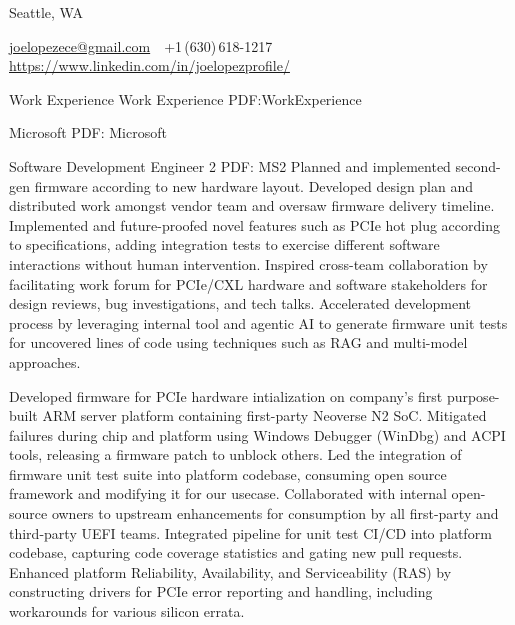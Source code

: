 \documentclass[letterpaper,MMMyyyy,nonstopmode]{simpleresumecv}
\newcommand {\CVAuthor}{Joe Lopez}
\newcommand {\CVLinkedin}{https://www.linkedin.com/in/joelopezprofile/}
\begin{document}

\Title{\CVAuthor}

\begin{SubTitle}
    Seattle, WA
    \par
    \href{mailto:joelopezece@gmail.com}{joelopezece@gmail.com}
    \,\SubBulletSymbol\,
    +1\,(630)\,618-1217
    \,\SubBulletSymbol\,
    \href{\CVLinkedin}
    {\url{\CVLinkedin}}
\end{SubTitle}

\begin{Body}

\Section
{Work Experience}
{Work Experience}
{PDF:WorkExperience}

\Entry 
{}
{Microsoft}
{PDF: Microsoft}

\Entry
{Software Development Engineer 2 }
{PDF: MS2}
    \BulletItem Planned and implemented second-gen firmware according to new hardware layout. Developed design plan and distributed work amongst vendor team and oversaw firmware delivery timeline.    
    \BulletItem Implemented and future-proofed novel features such as PCIe hot plug according to specifications, adding integration tests to exercise different software interactions without human intervention.
    \BulletItem Inspired cross-team collaboration by facilitating work forum for PCIe/CXL hardware and software stakeholders for design reviews, bug investigations, and tech talks.
    \BulletItem Accelerated development process by leveraging internal tool and agentic AI to generate firmware unit tests for uncovered lines of code using techniques such as RAG and multi-model approaches.

\BigGap

    \BulletItem Developed firmware for PCIe hardware intialization on company's first purpose-built ARM server platform containing first-party Neoverse N2 SoC.
    \BulletItem Mitigated failures during chip and platform using Windows Debugger (WinDbg) and ACPI tools, releasing a firmware patch to unblock others.
    \BulletItem Led the integration of firmware unit test suite into platform codebase, consuming open source framework and modifying it for our usecase.
    \BulletItem Collaborated with internal open-source owners to upstream enhancements for consumption by all first-party and third-party UEFI teams.
    \BulletItem Integrated pipeline for unit test CI/CD into platform codebase, capturing code coverage statistics and gating new pull requests.
    \BulletItem Enhanced platform Reliability, Availability, and Serviceability (RAS) by constructing drivers for PCIe error reporting and handling, including workarounds for various silicon errata.


\end{Body}
\end{document}
